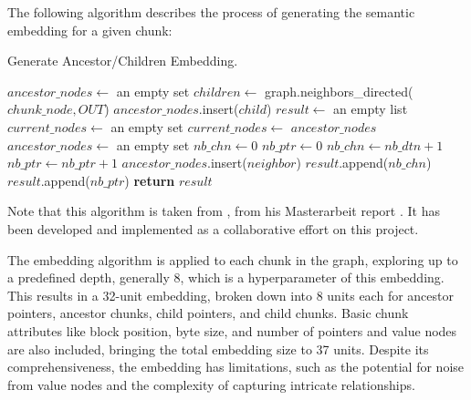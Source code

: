 The following algorithm describes the process of generating the semantic embedding for a given chunk:

\begin{algorithm}[H]
    \caption{Generate Ancestor/Children Embedding.}
    \label{algo:embedding:generate_ancestor_children_embedding}
    \begin{algorithmic}
            \State $ancestor\_nodes \gets$ an empty set
            \State $children \gets$ graph.neighbors\_directed($chunk\_node, OUT$) 
                \State $ancestor\_nodes$.insert($child$)
            \EndFor
            \State $result \gets$ an empty list
            \State $current\_nodes \gets$ an empty set
                \State $current\_nodes \gets$ $ancestor\_nodes$ 
                \State $ancestor\_nodes \gets$ an empty set
                \State $nb\_chn \gets 0$
                \State $nb\_ptr \gets 0$
                     
                        \State $nb\_chn \gets nb\_dtn + 1$
                        \State $nb\_ptr \gets nb\_ptr + 1$
                    \EndIf
                        \State $ancestor\_nodes$.insert($neighbor$) 
                    \EndFor
                \EndFor
                \State $result$.append($nb\_chn$) 
                \State $result$.append($nb\_ptr$) 
            \EndFor
            \State \textbf{return} $result$
        \EndFunction
    \end{algorithmic}
\end{algorithm}

Note that this algorithm is taken from \citeauthor{ClementEmbeddingsMasterarbeit23}, from his Masterarbeit report \cite{ClementEmbeddingsMasterarbeit23}. It has been developed and implemented as a collaborative effort on this project.

The embedding algorithm is applied to each chunk in the graph, exploring up to a predefined depth, generally 8, which is a hyperparameter of this embedding. This results in a 32-unit embedding, broken down into 8 units each for ancestor pointers, ancestor chunks, child pointers, and child chunks. Basic chunk attributes like block position, byte size, and number of pointers and value nodes are also included, bringing the total embedding size to 37 units. Despite its comprehensiveness, the embedding has limitations, such as the potential for noise from value nodes and the complexity of capturing intricate relationships.

